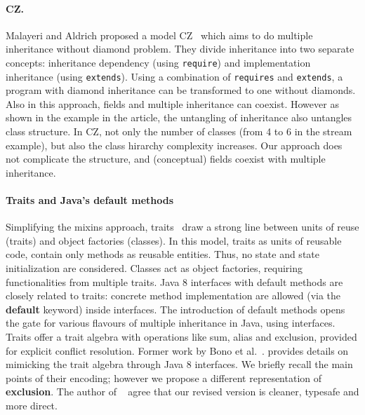 
\paragraph{CZ.}
Malayeri and Aldrich proposed a model CZ~\cite{malayeri2009cz} which aims to do
multiple inheritance without diamond problem. They divide inheritance into two
separate concepts: inheritance dependency (using \texttt{require}) and
implementation inheritance (using \texttt{extends}). Using a combination of
\texttt{requires} and \texttt{extends}, a program with diamond inheritance can be
transformed to one without diamonds. Also in this approach, fields and multiple
inheritance can coexist. However as shown in the example in the article, the
untangling of inheritance also untangles class structure. In CZ, not only the
number of classes (from 4 to 6 in the stream example), but also the class
hirarchy complexity increases. Our approach does not complicate the structure,
and (conceptual) fields coexist with multiple inheritance.

\paragraph{Traits and Java's default methods}
Simplifying the mixins approach, traits~\cite{scharli03traits} draw a
strong line between units of reuse (traits) and object factories
(classes). In this model, traits as units of reusable code, contain
only methods as reusable entities. Thus, no state and state
initialization are considered. Classes act as object factories,
requiring functionalities from multiple traits. Java 8 interfaces with
default methods are closely related to traits: concrete method
implementation are allowed (via the \textbf{default} keyword) inside
interfaces. The introduction of default methods opens the gate for
various flavours of multiple inheritance in Java, using interfaces.
Traits offer a trait algebra with operations like sum, alias and exclusion, provided
for explicit conflict resolution.  
Former work by Bono et al.~\cite{bono14}. provides details on
mimicking the trait algebra through Java 8 interfaces. 
We briefly recall the main points of their encoding;
however we propose a different representation of \textbf{exclusion}.
The author of ~\cite{bono14} agree that our revised version is
cleaner, typesafe and more direct.

